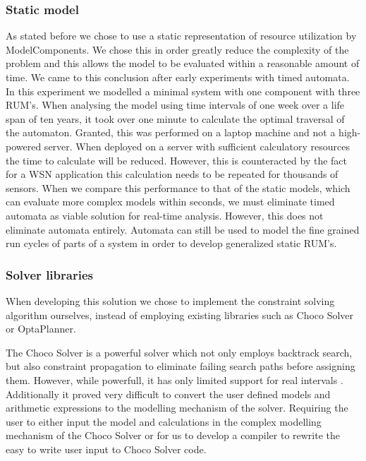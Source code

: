 \subsubsection{Static model}
As stated before we chose to use a static representation of resource utilization by ModelComponents. We chose this in order greatly reduce the complexity of the problem and this allows the model to be evaluated within a reasonable amount of time. We came to this conclusion after early experiments with timed automata. In this experiment we modelled a minimal system with one component with three RUM's. When analysing the model using time intervals of one week over a life span of ten years, it took over one minute to calculate the optimal traversal of the automaton. Granted, this was performed on a laptop machine and not a high-powered server. When deployed on a server with sufficient calculatory resources the time to calculate will be reduced. However, this is counteracted by the fact for a WSN application this calculation needs to be repeated for thousands of sensors. When we compare this performance to that of the static models, which can evaluate more complex models within seconds, we must eliminate timed automata as viable solution for real-time analysis. However, this does not eliminate automata entirely. Automata can still be used to model the fine grained run cycles of parts of a system in order to develop generalized static RUM's.


\subsubsection{Solver libraries}
When developing this solution we chose to implement the constraint solving algorithm ourselves, instead of employing existing libraries such as Choco Solver\cite{web:choco} or OptaPlanner\cite{web:opta}. 

The Choco Solver is a powerful solver which not only employs backtrack search, but also constraint propagation to eliminate failing search paths before assigning them. However, while powerfull, it has only limited support for real intervals \cite{ibex-choco}. Additionally it proved very difficult to convert the user defined models and arithmetic expressions to the modelling mechanism of the solver. Requiring the user to either input the model and calculations in the complex modelling mechanism of the Choco Solver or for us to develop a compiler to rewrite the easy to write user input to Choco Solver code.

